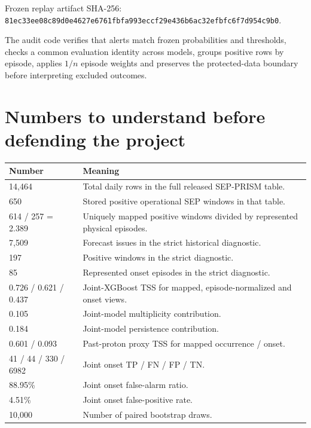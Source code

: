 \documentclass[11pt]{article}
\begin{document}
Frozen replay artifact SHA-256: \texttt{81ec33ee08c89d0e4627e6761fbfa993eccf29e436b6ac32efbfc6f7d954c9b0}.

The audit code verifies that alerts match frozen probabilities and thresholds, checks a common evaluation identity across models, groups positive rows by episode, applies $1/n$ episode weights and preserves the protected-data boundary before interpreting excluded outcomes.

\section{Numbers to understand before defending the project}

\begin{tabularx}{\textwidth}{lX}
\toprule
Number & Meaning \\
\midrule
14,464 & Total daily rows in the full released SEP-PRISM table. \\
650 & Stored positive operational SEP windows in that table. \\
614 / 257 = 2.389 & Uniquely mapped positive windows divided by represented physical episodes. \\
7,509 & Forecast issues in the strict historical diagnostic. \\
197 & Positive windows in the strict diagnostic. \\
85 & Represented onset episodes in the strict diagnostic. \\
0.726 / 0.621 / 0.437 & Joint-XGBoost TSS for mapped, episode-normalized and onset views. \\
0.105 & Joint-model multiplicity contribution. \\
0.184 & Joint-model persistence contribution. \\
0.601 / 0.093 & Past-proton proxy TSS for mapped occurrence / onset. \\
41 / 44 / 330 / 6982 & Joint onset TP / FN / FP / TN. \\
88.95\% & Joint onset false-alarm ratio. \\
4.51\% & Joint onset false-positive rate. \\
10,000 & Number of paired bootstrap draws. \\
\bottomrule
\end{tabularx}
\end{document}
